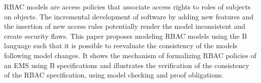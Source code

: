 \ac{RBAC} models are access policies that associate access rights to roles of subjects on objects. The incremental development of software by adding new features and the insertion of new access rules potentially render the model inconsistent and create security flaws. This paper proposes modeling \ac{RBAC} models using the B language such that it is possible to reevaluate the consistency of the models following model changes. It shows the mechanism of formalizing \ac{RBAC} policies of an \ac{EMS} using B specifications and illustrates the verification of the consistency of the \ac{RBAC} specification, using model checking and proof obligations.